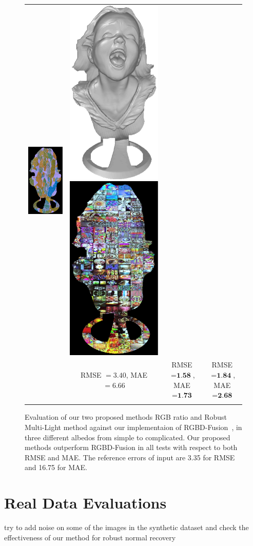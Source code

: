 \begin{figure}
{\begin{tabular}{cccc}
\includegraphics[height=0.25\linewidth]{figures/result/comp_robust_pattern_albedo.pdf} &
\includegraphics[height=0.25\linewidth]{figures/result/comp_robust_love_shape.pdf} 
\includegraphics[height=0.25\linewidth]{figures/result/comp_robust_love_albedo.pdf} \\
& {\small RMSE $= 3.40$, MAE $=6.66$} & {\small RMSE $= \textbf{1.58}$, MAE $=\textbf{1.73}$} & {\small RMSE $= \textbf{1.84}$, MAE $=\textbf{2.68}$} \\
 \\
  \end{tabular}
  }
  \caption{Evaluation of our two proposed methods RGB ratio and Robust Multi-Light method against our implementaion of RGBD-Fusion~\cite{or2015rgbd}, in three different albedos from simple to complicated. Our proposed methods outperform RGBD-Fusion in all tests with respect to both RMSE and MAE. The reference errors of input are 3.35 for RMSE and 16.75 for MAE.}
  \label{fig:result_syn_comp}
\end{figure}


\section{Real Data Evaluations}

try to add noise on some of the images in the synthetic dataset and check the effectiveness of our method for robust normal recovery
